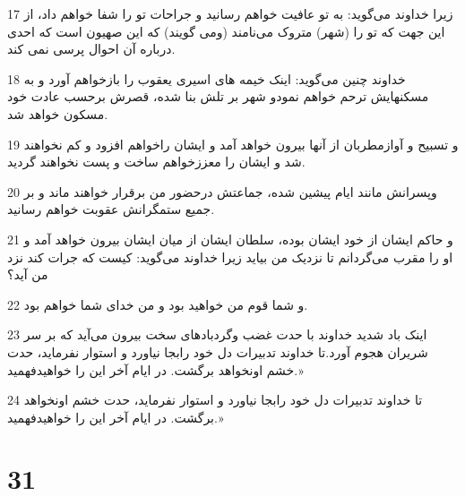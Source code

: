\par 17 زیرا خداوند می‌گوید: به تو عافیت خواهم رسانید و جراحات تو را شفا خواهم داد، از این جهت که تو را (شهر) متروک می‌نامند (ومی گویند) که این صهیون است که احدی درباره آن احوال پرسی نمی کند.
\par 18 خداوند چنین می‌گوید: اینک خیمه های اسیری یعقوب را بازخواهم آورد و به مسکنهایش ترحم خواهم نمودو شهر بر تلش بنا شده، قصرش برحسب عادت خود مسکون خواهد شد.
\par 19 و تسبیح و آوازمطربان از آنها بیرون خواهد آمد و ایشان راخواهم افزود و کم نخواهند شد و ایشان را معززخواهم ساخت و پست نخواهند گردید.
\par 20 وپسرانش مانند ایام پیشین شده، جماعتش درحضور من برقرار خواهند ماند و بر جمیع ستمگرانش عقوبت خواهم رسانید.
\par 21 و حاکم ایشان از خود ایشان بوده، سلطان ایشان از میان ایشان بیرون خواهد آمد و او را مقرب می‌گردانم تا نزدیک من بیاید زیرا خداوند می‌گوید: کیست که جرات کند نزد من آید؟
\par 22 و شما قوم من خواهید بود و من خدای شما خواهم بود.
\par 23 اینک باد شدید خداوند با حدت غضب وگردبادهای سخت بیرون می‌آید که بر سر شریران هجوم آورد.تا خداوند تدبیرات دل خود رابجا نیاورد و استوار نفرماید، حدت خشم اونخواهد برگشت. در ایام آخر این را خواهیدفهمید.»
\par 24 تا خداوند تدبیرات دل خود رابجا نیاورد و استوار نفرماید، حدت خشم اونخواهد برگشت. در ایام آخر این را خواهیدفهمید.»
 
\chapter{31}

